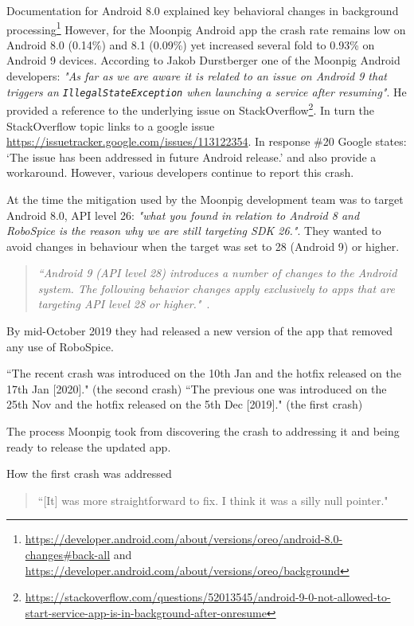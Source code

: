 Documentation for Android 8.0 explained key behavioral changes in background processing\footnote{\url{https://developer.android.com/about/versions/oreo/android-8.0-changes\#back-all} and \url{https://developer.android.com/about/versions/oreo/background}} However, for the Moonpig Android app the crash rate remains low on Android 8.0 (0.14\%) and 8.1 (0.09\%) yet increased several fold to 0.93\% on Android 9 devices. According to Jakob Durstberger one of the Moonpig Android developers: \textit{"As far as we are aware it is related to an issue on Android 9 that triggers an \texttt{IllegalStateException} when launching a service after resuming"}. He provided a reference to the underlying issue on StackOverflow\footnote{\url{https://stackoverflow.com/questions/52013545/android-9-0-not-allowed-to-start-service-app-is-in-background-after-onresume}}. In turn the StackOverflow topic links to a google issue \url{https://issuetracker.google.com/issues/113122354}. In response \#20 Google states: `The issue has been addressed in future Android release.' and also provide a workaround. However, various developers continue to report this crash. 

At the time the mitigation used by the Moonpig development team was to target Android 8.0, API level 26: \textit{"what you found in relation to Android 8 and RoboSpice is the reason why we are still targeting SDK 26."}. They wanted to avoid changes in behaviour when the target was set to 28 (Android 9) or higher.

\begin{quote}
    \emph{``Android 9 (API level 28) introduces a number of changes to the Android system. The following behavior changes apply exclusively to apps that are targeting API level 28 or higher."}~\citep{android_behavior_changes_apps_targeting_api_level_28plus}.
\end{quote}

By mid-October 2019 they had released a new version of the app that removed any use of RoboSpice. 


``The recent crash was introduced on the 10th Jan and the hotfix released on the 17th Jan [2020]." (the second crash)
``The previous one was introduced on the 25th Nov and the hotfix released on the 5th Dec [2019]." (the first crash)

The process Moonpig took from discovering the crash to addressing it and being ready to release the updated app.

How the first crash was addressed
\begin{quote}
    ``[It] was more straightforward to fix. I think it was a silly null pointer."
\end{quote}

